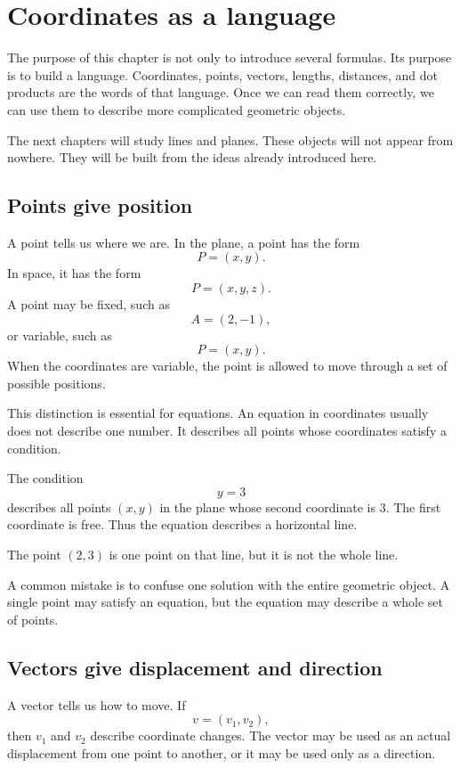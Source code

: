 \section{Coordinates as a language}

The purpose of this chapter is not only to introduce several formulas. Its purpose is to build a language. Coordinates, points, vectors, lengths, distances, and dot products are the words of that language. Once we can read them correctly, we can use them to describe more complicated geometric objects.

The next chapters will study lines and planes. These objects will not appear from nowhere. They will be built from the ideas already introduced here.

\subsection*{Points give position}

A point tells us where we are. In the plane, a point has the form
\[
P=(x,y).
\]
In space, it has the form
\[
P=(x,y,z).
\]
A point may be fixed, such as
\[
A=(2,-1),
\]
or variable, such as
\[
P=(x,y).
\]
When the coordinates are variable, the point is allowed to move through a set of possible positions.

This distinction is essential for equations. An equation in coordinates usually does not describe one number. It describes all points whose coordinates satisfy a condition.

\begin{examplebox}
The condition
\[
y=3
\]
describes all points \((x,y)\) in the plane whose second coordinate is \(3\). The first coordinate is free. Thus the equation describes a horizontal line.

The point \((2,3)\) is one point on that line, but it is not the whole line.
\end{examplebox}

A common mistake is to confuse one solution with the entire geometric object. A single point may satisfy an equation, but the equation may describe a whole set of points.

\subsection*{Vectors give displacement and direction}

A vector tells us how to move. If
\[
v=(v_1,v_2),
\]
then \(v_1\) and \(v_2\) describe coordinate changes. The vector may be used as an actual displacement from one point to another, or it may be used only as a direction.

